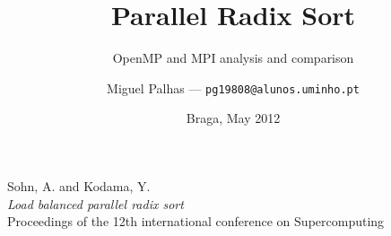 \documentclass[abstract=on,9pt,twocolumn]{scrartcl}
\title{Parallel Radix Sort}
\subtitle{OpenMP and MPI analysis and comparison}
\author{Miguel Palhas \hfill--- \texttt{\smaller pg19808@alunos.uminho.pt}}
\date{Braga, May 2012}
\begin{document}
	\maketitle

	

	\begin{thebibliography}{12345}
			Sohn, A. and Kodama, Y.	\\
			\textit{Load balanced parallel radix sort}	\\
		    Proceedings of the 12th international conference on Supercomputing	\\
	\end{thebibliography}
\end{document}

